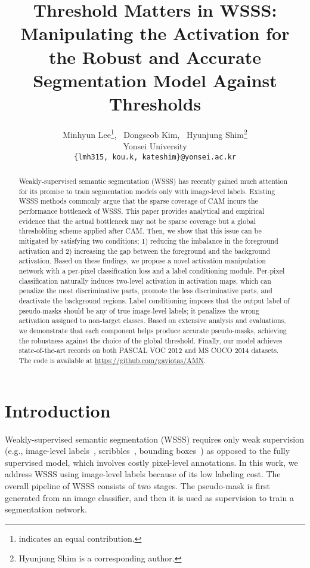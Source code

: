 \documentclass[10pt,twocolumn,letterpaper]{article}
\begin{document}
\title{Threshold Matters in WSSS: Manipulating the Activation for the Robust and Accurate Segmentation Model Against Thresholds}

\author{Minhyun Lee\thanks{indicates an equal contribution.}, \ Dongseob Kim, \ Hyunjung Shim\thanks{Hyunjung Shim is a corresponding author.}\\
Yonsei University\\
{\tt\small \{lmh315, kou.k, kateshim\}@yonsei.ac.kr}
} \maketitle
\begin{abstract}
Weakly-supervised semantic segmentation (WSSS) has recently gained much attention for its promise to train segmentation models only with image-level labels. Existing WSSS methods commonly argue that the sparse coverage of CAM incurs the performance bottleneck of WSSS. This paper provides analytical and empirical evidence that the actual bottleneck may not be sparse coverage but a global thresholding scheme applied after CAM. Then, we show that this issue can be mitigated by satisfying two conditions; 1) reducing the imbalance in the foreground activation and 2) increasing the gap between the foreground and the background activation. Based on these findings, we propose a novel activation manipulation network with a per-pixel classification loss and a label conditioning module. Per-pixel classification naturally induces two-level activation in activation maps, which can penalize the most discriminative parts, promote the less discriminative parts, and deactivate the background regions. Label conditioning imposes that the output label of pseudo-masks should be any of true image-level labels; it penalizes the wrong activation assigned to non-target classes. Based on extensive analysis and evaluations, we demonstrate that each component helps produce accurate pseudo-masks, achieving the robustness against the choice of the global threshold. Finally, our model achieves state-of-the-art records on both PASCAL VOC 2012 and MS COCO 2014 datasets. The code is available at \href{https://github.com/gaviotas/AMN}{https://github.com/gaviotas/AMN}.
\end{abstract} \section{Introduction}
\label{sec:intro}

Weakly-supervised semantic segmentation (WSSS) requires only weak supervision (e.g., image-level labels~\cite{pathak2015constrained,pinheiro2015image}, scribbles~\cite{lin2016scribblesup}, bounding boxes~\cite{khoreva2017simple}) as opposed to the fully supervised model, which involves costly pixel-level annotations. In this work, we address WSSS using image-level labels because of its low labeling cost. The overall pipeline of WSSS consists of two stages. The pseudo-mask is first generated from an image classifier, and then it is used as supervision to train a segmentation network. 
\end{document}
